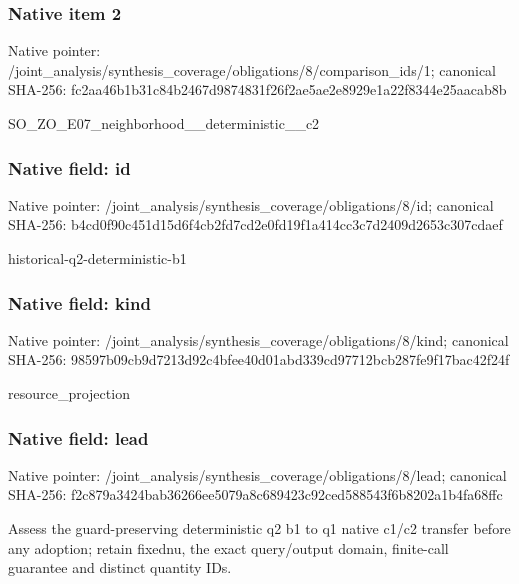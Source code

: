 \documentclass[10pt,a4paper]{article}
\begin{document}
\subsubsection{Native item 2}
Native pointer: /joint\_\allowbreak{}analysis/synthesis\_\allowbreak{}coverage/obligations/8/comparison\_\allowbreak{}ids/1; canonical SHA-256: fc2aa46b1b31c84b2467d9874831f26f2ae5ae2e8929e1a22f8344e25aacab8b

\begingroup\raggedright\sloppy SO\_\allowbreak{}ZO\_\allowbreak{}E07\_\allowbreak{}neighborhood\_\allowbreak{}\_\allowbreak{}deterministic\_\allowbreak{}\_\allowbreak{}c2\par\endgroup

\subsubsection{Native field: id}
Native pointer: /joint\_\allowbreak{}analysis/synthesis\_\allowbreak{}coverage/obligations/8/id; canonical SHA-256: b4cd0f90c451d15d6f4cb2fd7cd2e0fd19f1a414cc3c7d2409d2653c307cdaef

\begingroup\raggedright\sloppy historical-q2-deterministic-b1\par\endgroup

\subsubsection{Native field: kind}
Native pointer: /joint\_\allowbreak{}analysis/synthesis\_\allowbreak{}coverage/obligations/8/kind; canonical SHA-256: 98597b09cb9d7213d92c4bfee40d01abd339cd97712bcb287fe9f17bac42f24f

\begingroup\raggedright\sloppy resource\_\allowbreak{}projection\par\endgroup

\subsubsection{Native field: lead}
Native pointer: /joint\_\allowbreak{}analysis/synthesis\_\allowbreak{}coverage/obligations/8/lead; canonical SHA-256: f2c879a3424bab36266ee5079a8c689423c92ced588543f6b8202a1b4fa68ffc

\begingroup\raggedright\sloppy Assess the guard-preserving deterministic q2 b1 to q1 native c1/\allowbreak{}c2 transfer before any adoption;\allowbreak{} retain fixednu,\allowbreak{} the exact query/\allowbreak{}output domain,\allowbreak{} finite-call guarantee and distinct quantity IDs.\par\endgroup
\end{document}
